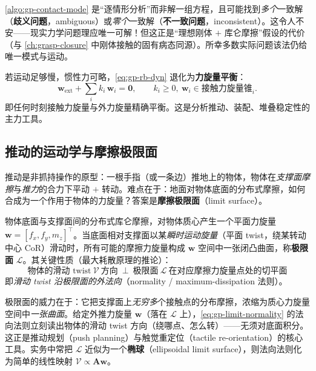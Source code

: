 \begin{note}
\cref{algo:gp-contact-mode} 是“逐情形分析”而非解一组方程，且可能找到\emph{多个}一致解（\textbf{歧义问题}，ambiguous）或\emph{零个}一致解（\textbf{不一致问题}，inconsistent）。这令人不安——现实力学问题理应唯一可解！但这正是“理想刚体 $+$ 库仑摩擦”假设的代价（与 \cref{ch:grasp-closure} 中刚体接触的固有病态同源）。所幸多数实际问题该法仍给唯一模式与运动。
\end{note}

\begin{definition}\label{def:gp-quasistatic}
若运动足够慢，惯性力可略，\cref{eq:gp-rb-dyn} 退化为\textbf{力旋量平衡}：
\begin{equation}
  \mathbf{w}_{\text{ext}}+\sum_i k_i\,\mathbf{w}_i=\mathbf{0},\qquad k_i\ge 0,\ \mathbf{w}_i\in\text{接触力旋量锥}_i.
  \label{eq:gp-quasistatic}
\end{equation}
即任何时刻接触力旋量与外力旋量精确平衡。这是分析推动、装配、堆叠稳定性的主力工具。
\end{definition}

\subsection{推动的运动学与摩擦极限面}
\label{sec:gp-pushing}
推动是非抓持操作的原型：一根手指（或一条边）推地上的物体，物体在\emph{支撑面摩擦}与\emph{推力}的合力下平动 $+$ 转动。难点在于：地面对物体底面的分布式摩擦，如何合成为一个作用于物体的力旋量？答案是\textbf{摩擦极限面}（limit surface）。

\begin{definition}\label{def:gp-limit-surface}
物体底面与支撑面间的分布式库仑摩擦，对物体质心产生一个平面力旋量 $\mathbf{w}=[f_x,f_y,m_z]^\top$。当底面相对支撑面以某\emph{瞬时运动旋量}（平面 twist，绕某转动中心 CoR）滑动时，所有可能的摩擦力旋量构成 $\mathbf{w}$ 空间中一张闭凸曲面，称\textbf{极限面} $\mathcal{L}$。其关键性质（最大耗散原理的推论）：
\begin{equation}
  \boxed{\;\text{物体的滑动 twist}\ \boldsymbol{\mathcal{V}}\ \text{方向}\ \perp\ \text{极限面}\ \mathcal{L}\ \text{在对应摩擦力旋量点处的切平面}\;}
  \label{eq:gp-limit-normality}
\end{equation}
即\emph{滑动 twist 沿极限面的外法向}（normality / maximum-dissipation 法则）。
\end{definition}

\begin{insight}
极限面的威力在于：它把支撑面上\emph{无穷多}个接触点的分布摩擦，浓缩为质心力旋量空间中\emph{一张曲面}。给定外推力旋量 $\mathbf{w}$（落在 $\mathcal{L}$ 上），\cref{eq:gp-limit-normality} 的法向法则立刻读出物体的滑动 twist 方向（绕哪点、怎么转）——无须对底面积分。这正是推动规划（push planning）与触觉重定位（tactile re-orientation）的核心工具。实务中常把 $\mathcal{L}$ 近似为一个\textbf{椭球}（ellipsoidal limit surface），则法向法则化为简单的线性映射 $\boldsymbol{\mathcal{V}}\propto\mathbf{A}\mathbf{w}$。
\end{insight}

